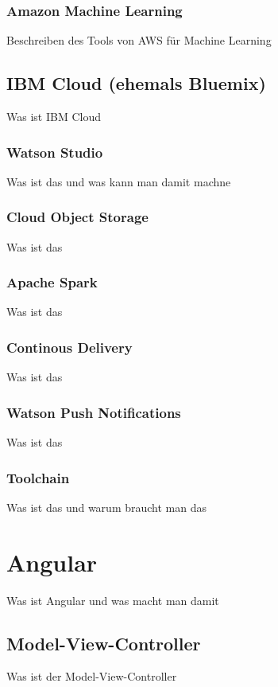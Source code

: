\subsubsection{Amazon Machine Learning}
Beschreiben des Tools von AWS für Machine Learning

\subsection{IBM Cloud (ehemals Bluemix)}
Was ist IBM Cloud

\subsubsection{Watson Studio}
Was ist das und was kann man damit machne

\subsubsection{Cloud Object Storage}
Was ist das

\subsubsection{Apache Spark}
Was ist das

\subsubsection{Continous Delivery}
Was ist das

\subsubsection{Watson Push Notifications}
Was ist das

\subsubsection{Toolchain}
Was ist das und warum braucht man das

\section{Angular}
Was ist Angular und was macht man damit

\subsection{Model-View-Controller}
Was ist der Model-View-Controller

